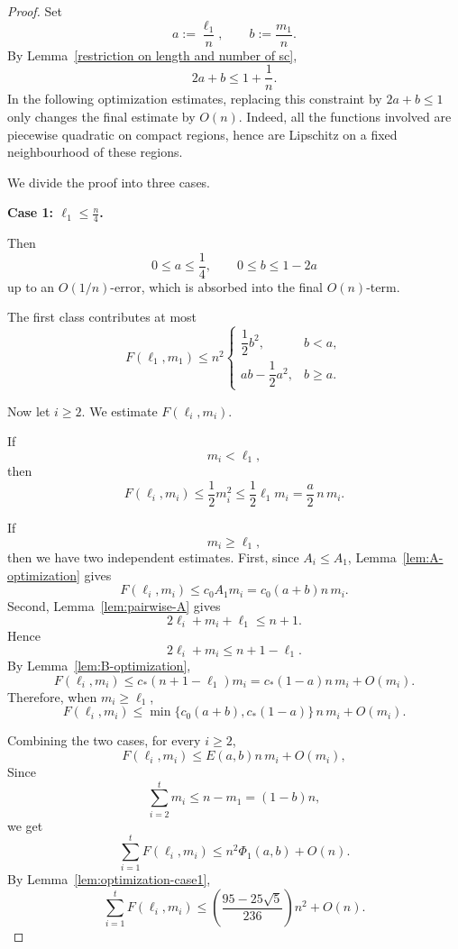 \documentclass[10pt,a4paper]{amsart}
\begin{document}
\begin{proof}
Set
\[
        a:=\frac{\ell_1}{n},
        \qquad
        b:=\frac{m_1}{n}.
\]
By Lemma~\ref{restriction on length and number of sc},
\[
        2a+b\le 1+\frac1n.
\]
In the following optimization estimates, replacing this constraint by
\(2a+b\le1\) only changes the final estimate by \(O(n)\). Indeed, all the
functions involved are piecewise quadratic on compact regions, hence are
Lipschitz on a fixed neighbourhood of these regions.

We divide the proof into three cases.

\medskip

\noindent
\textbf{Case 1: \(\ell_1\le \frac n4\).}

Then
\[
        0\le a\le\frac14,
        \qquad
        0\le b\le 1-2a
\]
up to an \(O(1/n)\)-error, which is absorbed into the final \(O(n)\)-term.

The first class contributes at most
\[
        F(\ell_1,m_1)
        \le
        n^2
        \begin{cases}
        \dfrac12b^2,& b<a,\\[1mm]
        ab-\dfrac12a^2,& b\ge a.
        \end{cases}
\]

Now let \(i\ge2\). We estimate \(F(\ell_i,m_i)\).

If
\[
        m_i<\ell_1,
\]
then
\[
        F(\ell_i,m_i)\le \frac12m_i^2
        \le
        \frac12\ell_1m_i
        =
        \frac a2\,n\,m_i.
\]

If
\[
        m_i\ge\ell_1,
\]
then we have two independent estimates. First, since \(A_i\le A_1\),
Lemma~\ref{lem:A-optimization} gives
\[
        F(\ell_i,m_i)
        \le
        c_0A_1m_i
        =
        c_0(a+b)n\,m_i.
\]
Second, Lemma~\ref{lem:pairwise-A} gives
\[
        2\ell_i+m_i+\ell_1\le n+1.
\]
Hence
\[
        2\ell_i+m_i\le n+1-\ell_1.
\]
By Lemma~\ref{lem:B-optimization},
\[
        F(\ell_i,m_i)
        \le
        c_*(n+1-\ell_1)m_i
        =
        c_*(1-a)n\,m_i+O(m_i).
\]
Therefore, when \(m_i\ge\ell_1\),
\[
        F(\ell_i,m_i)
        \le
        \min\{c_0(a+b),c_*(1-a)\}\,n\,m_i+O(m_i).
\]

Combining the two cases, for every \(i\ge2\),
\[
        F(\ell_i,m_i)
        \le
        E(a,b)n\,m_i+O(m_i),
\]
Since
\[
        \sum_{i=2}^t m_i\le n-m_1=(1-b)n,
\]
we get
\[
        \sum_{i=1}^t F(\ell_i,m_i)
        \le
        n^2\Phi_1(a,b)+O(n).
\]
By Lemma~\ref{lem:optimization-case1},
\[
        \sum_{i=1}^t F(\ell_i,m_i)
        \le
        \left(\frac{95-25\sqrt5}{236}\right)n^2+O(n).
\]


\end{proof}
\end{document}
